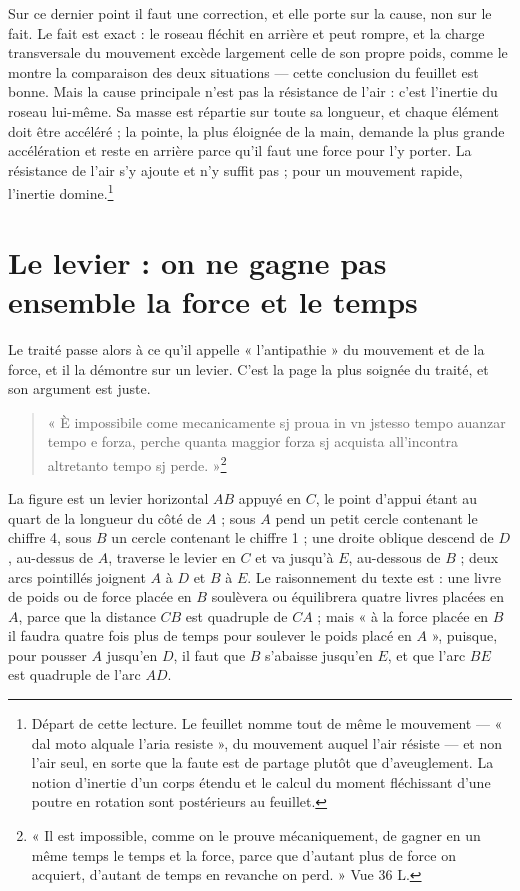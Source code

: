\documentclass[11pt,a4paper]{article}
\begin{document}
Sur ce dernier point il faut une correction, et elle porte sur la cause, non sur
le fait. Le fait est exact : le roseau fléchit en arrière et peut rompre, et la
charge transversale du mouvement excède largement celle de son propre poids,
comme le montre la comparaison des deux situations — cette conclusion du feuillet
est bonne. Mais la cause principale n'est pas la résistance de l'air : c'est
l'inertie du roseau lui-même. Sa masse est répartie sur toute sa longueur, et
chaque élément doit être accéléré ; la pointe, la plus éloignée de la main,
demande la plus grande accélération et reste en arrière parce qu'il faut une
force pour l'y porter. La résistance de l'air s'y ajoute et n'y suffit pas ; pour
un mouvement rapide, l'inertie domine.\footnote{Départ de cette lecture. Le
feuillet nomme tout de même le mouvement — « dal moto alquale l'aria resiste »,
du mouvement auquel l'air résiste — et non l'air seul, en sorte que la faute est
de partage plutôt que d'aveuglement. La notion d'inertie d'un corps étendu et le
calcul du moment fléchissant d'une poutre en rotation sont postérieurs au
feuillet.}

\section*{Le levier : on ne gagne pas ensemble la force et le temps}

Le traité passe alors à ce qu'il appelle « l'antipathie » du mouvement et de la
force, et il la démontre sur un levier. C'est la page la plus soignée du traité,
et son argument est juste.

\begin{quote}
« È impossibile come mecanicamente sj proua in vn jstesso tempo auanzar tempo e
forza, perche quanta maggior forza sj acquista all'incontra altretanto tempo sj
perde. »\footnote{« Il est impossible, comme on le prouve mécaniquement, de
gagner en un même temps le temps et la force, parce que d'autant plus de force
on acquiert, d'autant de temps en revanche on perd. » Vue 36 L.}
\end{quote}

La figure est un levier horizontal $AB$ appuyé en $C$, le point d'appui étant au
quart de la longueur du côté de $A$ ; sous $A$ pend un petit cercle contenant le
chiffre 4, sous $B$ un cercle contenant le chiffre 1 ; une droite oblique
descend de $D$, au-dessus de $A$, traverse le levier en $C$ et va jusqu'à $E$,
au-dessous de $B$ ; deux arcs pointillés joignent $A$ à $D$ et $B$ à $E$. Le
raisonnement du texte est : une livre de poids ou de force placée en $B$
soulèvera ou équilibrera quatre livres placées en $A$, parce que la distance
$CB$ est quadruple de $CA$ ; mais « à la force placée en $B$ il faudra quatre
fois plus de temps pour soulever le poids placé en $A$ », puisque, pour pousser
$A$ jusqu'en $D$, il faut que $B$ s'abaisse jusqu'en $E$, et que l'arc $BE$ est
quadruple de l'arc $AD$.
\end{document}
